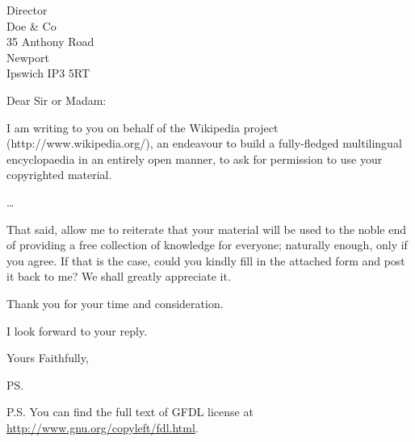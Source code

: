 \documentclass{extletter}
\begin{document}
\begin{letter}{Director \\ Doe \& Co \\ 35 Anthony Road
\\ Newport \\ Ipswich IP3 5RT}
\opening{Dear Sir or Madam:}

I am writing to you on behalf of the Wikipedia project (http://www.wikipedia.org/),
an endeavour to build a fully-fledged multilingual encyclopaedia in an entirely
open manner, to ask for permission to use your copyrighted material.

\ldots

That said, allow me to reiterate that your material will be used to the noble end of
providing a free collection of knowledge for everyone; naturally enough, only if you
agree. If that is the case, could you kindly fill in the attached form and post it
back to me? We shall greatly appreciate it.

Thank you for your time and consideration.

I look forward to your reply.

\closing{Yours Faithfully,}

\ps

P.S. You can find the full text of GFDL license at
\url{http://www.gnu.org/copyleft/fdl.html}.


\end{letter}
\end{document}
